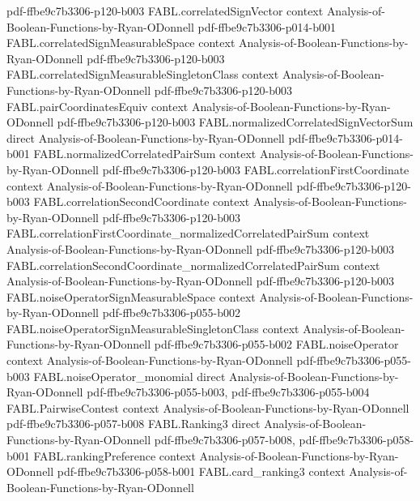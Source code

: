 \begin{theorem}
  {pdf-ffbe9c7b3306-p120-b003}
\proofstep
  {FABL.correlatedSignVector}
  {context}
  {Analysis-of-Boolean-Functions-by-Ryan-ODonnell}
  {pdf-ffbe9c7b3306-p014-b001}
\proofstep
  {FABL.correlatedSignMeasurableSpace}
  {context}
  {Analysis-of-Boolean-Functions-by-Ryan-ODonnell}
  {pdf-ffbe9c7b3306-p120-b003}
\proofstep
  {FABL.correlatedSignMeasurableSingletonClass}
  {context}
  {Analysis-of-Boolean-Functions-by-Ryan-ODonnell}
  {pdf-ffbe9c7b3306-p120-b003}
\proofstep
  {FABL.pairCoordinatesEquiv}
  {context}
  {Analysis-of-Boolean-Functions-by-Ryan-ODonnell}
  {pdf-ffbe9c7b3306-p120-b003}
\proofstep
  {FABL.normalizedCorrelatedSignVectorSum}
  {direct}
  {Analysis-of-Boolean-Functions-by-Ryan-ODonnell}
  {pdf-ffbe9c7b3306-p014-b001}
\proofstep
  {FABL.normalizedCorrelatedPairSum}
  {context}
  {Analysis-of-Boolean-Functions-by-Ryan-ODonnell}
  {pdf-ffbe9c7b3306-p120-b003}
\proofstep
  {FABL.correlationFirstCoordinate}
  {context}
  {Analysis-of-Boolean-Functions-by-Ryan-ODonnell}
  {pdf-ffbe9c7b3306-p120-b003}
\proofstep
  {FABL.correlationSecondCoordinate}
  {context}
  {Analysis-of-Boolean-Functions-by-Ryan-ODonnell}
  {pdf-ffbe9c7b3306-p120-b003}
\proofstep
  {FABL.correlationFirstCoordinate_normalizedCorrelatedPairSum}
  {context}
  {Analysis-of-Boolean-Functions-by-Ryan-ODonnell}
  {pdf-ffbe9c7b3306-p120-b003}
\proofstep
  {FABL.correlationSecondCoordinate_normalizedCorrelatedPairSum}
  {context}
  {Analysis-of-Boolean-Functions-by-Ryan-ODonnell}
  {pdf-ffbe9c7b3306-p120-b003}
\proofstep
  {FABL.noiseOperatorSignMeasurableSpace}
  {context}
  {Analysis-of-Boolean-Functions-by-Ryan-ODonnell}
  {pdf-ffbe9c7b3306-p055-b002}
\proofstep
  {FABL.noiseOperatorSignMeasurableSingletonClass}
  {context}
  {Analysis-of-Boolean-Functions-by-Ryan-ODonnell}
  {pdf-ffbe9c7b3306-p055-b002}
\proofstep
  {FABL.noiseOperator}
  {context}
  {Analysis-of-Boolean-Functions-by-Ryan-ODonnell}
  {pdf-ffbe9c7b3306-p055-b003}
\proofstep
  {FABL.noiseOperator_monomial}
  {direct}
  {Analysis-of-Boolean-Functions-by-Ryan-ODonnell}
  {pdf-ffbe9c7b3306-p055-b003,
    pdf-ffbe9c7b3306-p055-b004}
\proofstep
  {FABL.PairwiseContest}
  {context}
  {Analysis-of-Boolean-Functions-by-Ryan-ODonnell}
  {pdf-ffbe9c7b3306-p057-b008}
\proofstep
  {FABL.Ranking3}
  {direct}
  {Analysis-of-Boolean-Functions-by-Ryan-ODonnell}
  {pdf-ffbe9c7b3306-p057-b008,
    pdf-ffbe9c7b3306-p058-b001}
\proofstep
  {FABL.rankingPreference}
  {context}
  {Analysis-of-Boolean-Functions-by-Ryan-ODonnell}
  {pdf-ffbe9c7b3306-p058-b001}
\proofstep
  {FABL.card_ranking3}
  {context}
  {Analysis-of-Boolean-Functions-by-Ryan-ODonnell}

\end{theorem}
